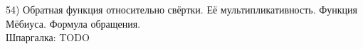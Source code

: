 54) Обратная функция относительно свёртки. Её мультипликативность. Функция Мёбиуса. Формула обращения.\\

Шпаргалка: TODO\\
